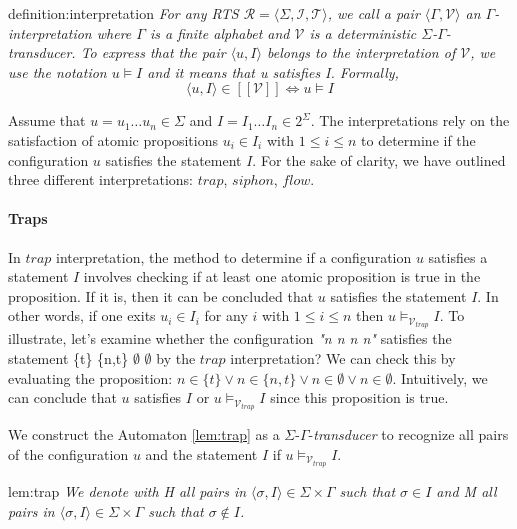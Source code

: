 \begin{theo}[Interpretation]{definition:interpretation}
    \textit{
        For any RTS $\mathcal{R} = \langle \Sigma, \mathcal{I}, \mathcal{T} \rangle$, we call 
        a pair $\langle \Gamma, \mathcal{V} \rangle$ an $\Gamma$-\textit{interpretation}
        where $\Gamma$ is a finite alphabet and $\mathcal{V}$ is a deterministic $\Sigma$-$\Gamma$-\textit{transducer}.
        To express that the pair $\langle u, I \rangle$ belongs to the interpretation of $\mathcal{V}$, we use the notation $u \models I$ and it means that u satisfies I.
        Formally,
     }
     \begin{equation*}
        \langle u, I \rangle \in [[\mathcal{V}]] \Leftrightarrow u \models I
     \end{equation*}
\end{theo}
Assume that $u = u_1 \dots u_n \in \Sigma$ and $I = I_1 \dots I_n\in 2^\Sigma$.
The interpretations rely on the satisfaction of atomic propositions $u_i \in I_i$ with $1 \leq i \leq n$ 
to determine if the configuration $u$ satisfies the statement $I$.
For the sake of clarity, we have outlined three different interpretations: $trap$, $siphon$, $flow$.

\paragraph*{Traps} 
In $trap$ interpretation, the method to determine if a configuration $u$ satisfies a statement $I$ 
involves checking if at least one atomic proposition is true in the proposition. 
If it is, then it can be concluded that $u$ satisfies the statement $I$. 
In other words, if one exits $u_i \in I_i$ for any $i$ with $1 \leq i \leq n$ then $u \models_{\mathcal{V}_{trap}} I$.
To illustrate, let's examine whether the configuration \textit{"n n n n"} satisfies the statement \{t\} \{n,t\} $\emptyset$ $\emptyset$ by the $trap$ interpretation?
We can check this by evaluating the proposition: $n \in \{t\} \vee n \in \{n,t\} \vee n \in \emptyset \vee n \in \emptyset$.
Intuitively, we can conclude that $u$ satisfies $I$ or $u \models_{\mathcal{V}_{trap}} I$ since this proposition is true.

We construct the Automaton \ref{lem:trap} as a $\Sigma$-$\Gamma$-\textit{transducer} to recognize all pairs of the configuration $u$ and the statement $I$
if $u \models_{\mathcal{V}_{trap}} I$.
\newpage
\begin{lem}{lem:trap}
    \textit{We denote with H all pairs in $\langle \sigma, I \rangle \in \Sigma \times \Gamma$
    such that  $\sigma \in I$ and M all pairs in $\langle \sigma, I \rangle \in \Sigma \times \Gamma$
    such that  $\sigma \notin I$.}

\end{lem}

